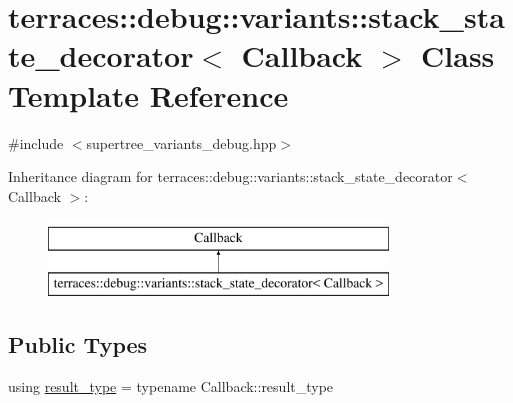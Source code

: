 \hypertarget{classterraces_1_1debug_1_1variants_1_1stack__state__decorator}{}\section{terraces\+:\+:debug\+:\+:variants\+:\+:stack\+\_\+state\+\_\+decorator$<$ Callback $>$ Class Template Reference}
\label{classterraces_1_1debug_1_1variants_1_1stack__state__decorator}


{\ttfamily \#include $<$supertree\+\_\+variants\+\_\+debug.\+hpp$>$}

Inheritance diagram for terraces\+:\+:debug\+:\+:variants\+:\+:stack\+\_\+state\+\_\+decorator$<$ Callback $>$\+:\begin{figure}[H]
\begin{center}
\leavevmode
\includegraphics[height=2.000000cm]{classterraces_1_1debug_1_1variants_1_1stack__state__decorator}
\end{center}
\end{figure}
\subsection*{Public Types}
\begin{DoxyCompactItemize}
\item 
using \hyperlink{classterraces_1_1debug_1_1variants_1_1stack__state__decorator_a01062643b31a3124c3e77d409f112785}{result\+\_\+type} = typename Callback\+::result\+\_\+type
\end{DoxyCompactItemize}
